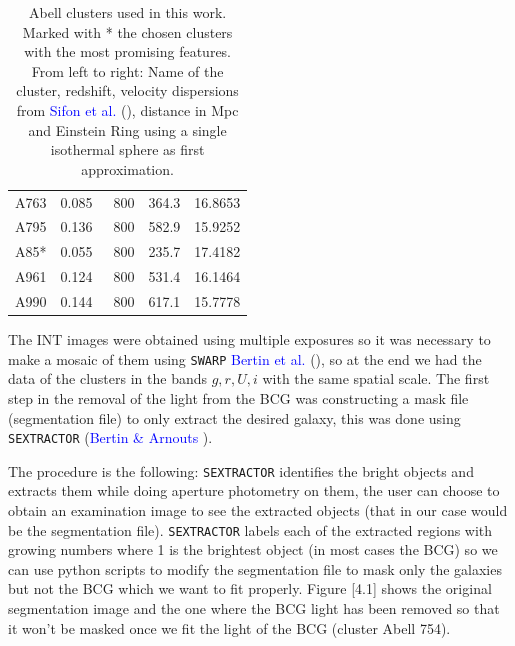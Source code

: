 \begin{table}[H]
\begin{tabular}{ccccc}
A763    & 0.085 & ~800           & 364.3 & 16.8653   \\
A795    & 0.136 & ~800           & 582.9 & 15.9252   \\
A85*    & 0.055 & ~800           & 235.7 & 17.4182   \\
A961    & 0.124 & ~800           & 531.4 & 16.1464   \\
A990    & 0.144 & ~800           & 617.1 & 15.7778   
\end{tabular}
\caption[Abell Clusters and their redshift]{Abell clusters used in this work. Marked with * the chosen clusters with the most promising features. From left to right: Name of the cluster, redshift, velocity dispersions from \textcolor{blue}{Sifon et al.} (\citeyear{Reference6}), distance in Mpc and Einstein Ring using a single isothermal sphere as first approximation.}
\end{table}

The INT images were obtained using multiple exposures so it was necessary to make a mosaic of them using \texttt{SWARP} \textcolor{blue}{Bertin et al.} (\citeyear{Reference29}), so at the end we had the data of the clusters in the bands $g,r,U,i$ with the same spatial scale. The first step in the removal of the light from the BCG was constructing a mask file (segmentation file) to only extract the desired galaxy, this was done using \texttt{SEXTRACTOR} (\textcolor{blue}{Bertin \& Arnouts} \citeyear{Reference27}). 

The procedure is the following: \texttt{SEXTRACTOR} identifies the bright objects and extracts them while doing aperture photometry on them, the user can choose to obtain an examination image to see the extracted objects (that in our case would be the segmentation file). \texttt{SEXTRACTOR} labels each of the extracted regions with growing numbers where 1 is the brightest object (in most cases the BCG) so we can use python scripts to modify the segmentation file to mask only the galaxies but not the BCG which we want to fit properly. Figure [4.1] shows the original segmentation image and the one where the BCG light has been removed so that it won't be masked once we fit the light of the BCG (cluster Abell 754). 

